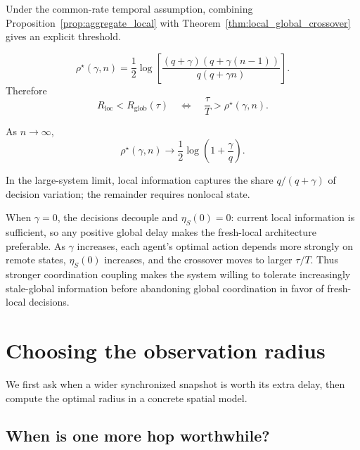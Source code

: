 \documentclass[11pt]{article}
\begin{document}
Under the common-rate temporal assumption, combining Proposition~\ref{prop:aggregate_local} with
Theorem~\ref{thm:local_global_crossover} gives an explicit threshold.

\begin{equation}
    \boxed{
    \rho^\star(\gamma,n)
    =
    \frac{1}{2}
    \log
    \left[
        \frac{
            (q+\gamma)
            \left(
                q+\gamma(n-1)
            \right)
        }{
            q(q+\gamma n)
        }
    \right].
    }
    \label{eq:aggregate_rho_star}
\end{equation}
Therefore
\begin{equation}
    R_{\mathrm{loc}}
    <
    R_{\mathrm{glob}}(\tau)
    \quad\Longleftrightarrow\quad
    \frac{\tau}{T}
    >
    \rho^\star(\gamma,n).
    \label{eq:aggregate_crossover}
\end{equation}

As $n\rightarrow\infty$,
\begin{equation}
    \boxed{
    \rho^\star(\gamma,n)
    \longrightarrow
    \frac{1}{2}
    \log
    \left(
        1+\frac{\gamma}{q}
    \right).
    }
    \label{eq:large_n_threshold}
\end{equation}

In the large-system limit, local information captures the share
$q/(q+\gamma)$ of decision variation; the remainder requires nonlocal state.

When $\gamma=0$, the decisions decouple and
$\eta_S(0)=0$: current local information is sufficient, so any
positive global delay makes the fresh-local architecture preferable. As $\gamma$
increases, each agent's optimal action depends more strongly on remote states,
$\eta_S(0)$ increases, and the crossover moves to larger
$\tau/T$. Thus stronger coordination coupling makes the system willing to
tolerate increasingly stale-global information before abandoning global
coordination in favor of fresh-local decisions.

\section{Choosing the observation radius}
\label{sec:optimal_coordination_scale}

We first ask when a wider synchronized snapshot is worth its extra delay,
then compute the optimal radius in a concrete spatial model.

\subsection{When is one more hop worthwhile?}
\label{subsec:radius_dependent_architectures}
\end{document}
